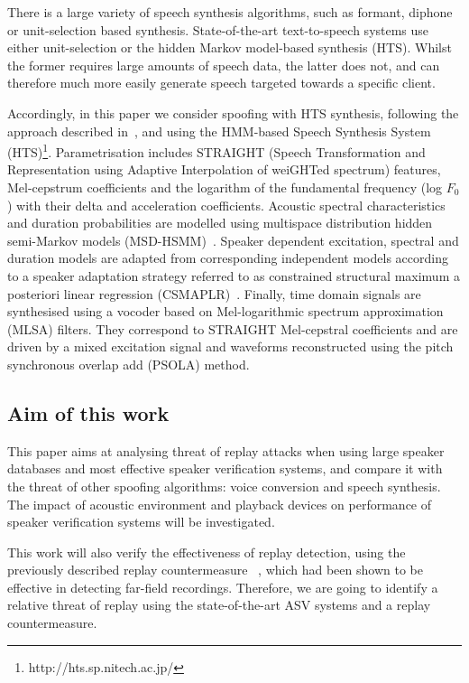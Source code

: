 There is a large variety of speech synthesis algorithms, such as formant, diphone or unit-selection based synthesis. State-of-the-art text-to-speech systems use either unit-selection or the hidden Markov model-based synthesis (HTS). Whilst the former requires large amounts of speech data, the latter does not, and can therefore much more easily generate speech targeted towards a specific client. 

Accordingly, in this paper we consider spoofing with HTS synthesis, following the approach described in~\cite{Yamagishi2009}, and using the HMM-based Speech Synthesis System (HTS)\footnote{http://hts.sp.nitech.ac.jp/}. Parametrisation includes STRAIGHT (Speech Transformation and Representation using Adaptive Interpolation of weiGHTed spectrum) features, Mel-cepstrum coefficients and the logarithm of the fundamental frequency (log $F_{0}$) with their delta and acceleration coefficients. Acoustic spectral characteristics and duration probabilities are modelled using multispace distribution hidden semi-Markov models (MSD-HSMM)~\cite{Russell1985}.  Speaker dependent  excitation, spectral and duration models are adapted from corresponding independent models according to a speaker adaptation strategy referred to as constrained structural maximum a posteriori linear regression (CSMAPLR)~\cite{Yamagishi2009a}.  Finally, time domain signals are synthesised using a vocoder based on Mel-logarithmic spectrum approximation (MLSA) filters.  They correspond to STRAIGHT Mel-cepstral coefficients and are driven by a mixed excitation signal and waveforms reconstructed using the pitch synchronous overlap add (PSOLA) method.


\subsection{Aim of this work}

This paper aims at analysing threat of replay attacks when using large speaker databases and most effective speaker verification systems, and compare it with the threat of other spoofing algorithms: voice conversion and speech synthesis. The impact of acoustic environment and playback devices on performance of speaker verification systems will be investigated. 

This work will also verify the effectiveness of replay detection, using the previously described replay countermeasure ~\cite{Villalba2011}, which had been  shown to be effective in detecting far-field recordings. Therefore, we are going to identify a relative threat of replay using the state-of-the-art ASV systems and a replay countermeasure.


